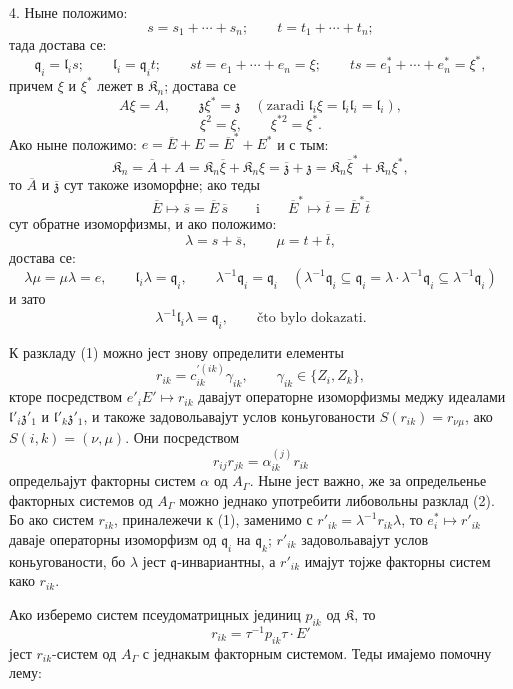\documentclass[11pt]{article}
\begin{document}
4. Ныне положимо:
\[
s=s_1+\cdots+s_n;\qquad t=t_1+\cdots+t_n;
\]
тада достава се:
\[
\mathfrak q_i=\mathfrak l_is;\qquad
\mathfrak l_i=\mathfrak q_it;\qquad
st=e_1+\cdots+e_n=\xi;\qquad
ts=e_1^*+\cdots+e_n^*=\xi^*,
\]
причем \(\xi\) и \(\xi^*\) лежет в \(\mathfrak K_n\); достава се
\[
A\xi=A,\qquad \mathfrak z\xi^*=\mathfrak z\quad
(\text{zaradi }\mathfrak l_i\xi=\mathfrak l_i\mathfrak l_i=\mathfrak l_i),
\]
\[
\xi^2=\xi,\qquad \xi^{*2}=\xi^*.
\]
Ако ныне положимо: \(e=\overline E+E=\overline E^*+E^*\) и с тым:
\[
\mathfrak K_n=\overline A+A
=\mathfrak K_n\overline\xi+\mathfrak K_n\xi
=\overline{\mathfrak z}+\mathfrak z
=\mathfrak K_n\overline\xi^*+\mathfrak K_n\xi^*,
\]
то \(\overline A\) и \(\overline{\mathfrak z}\) сут такоже изоморфне; ако теды
\[
\overline E\mapsto\overline s=\overline E\,\overline s
\qquad\text{i}\qquad
\overline E^*\mapsto\overline t=\overline E^*\overline t
\]
сут обратне изоморфизмы, и ако положимо:
\[
\lambda=s+\overline s,\qquad \mu=t+\overline t,
\]
достава се:
\[
\lambda\mu=\mu\lambda=e,\qquad
\mathfrak l_i\lambda=\mathfrak q_i,\qquad
\lambda^{-1}\mathfrak q_i=\mathfrak q_i
\quad
(\lambda^{-1}\mathfrak q_i\subseteq\mathfrak q_i
=\lambda\cdot\lambda^{-1}\mathfrak q_i\subseteq\lambda^{-1}\mathfrak q_i)
\]
и зато
\[
\lambda^{-1}\mathfrak l_i\lambda=\mathfrak q_i,\qquad \text{čto bylo dokazati.}
\]

К разкладу (1) можно јест знову определити елементы
\[
r_{ik}=c_{ik}^{\prime(ik)}\gamma_{ik},\qquad \gamma_{ik}\in\{Z_i,Z_k\},
\]
кторе посредством \(e'_iE'\mapsto r_{ik}\) давајут операторне изоморфизмы меджу идеалами \(\mathfrak l'_i\mathfrak z'_1\) и \(\mathfrak l'_k\mathfrak z'_1\), и такоже задовольавајут услов коньугованости \(S(r_{ik})=r_{\nu\mu}\), ако \(S(i,k)=(\nu,\mu)\). Они посредством
\[
r_{ij}r_{jk}=\alpha_{ik}^{(j)}r_{ik}
\]
определьајут факторны систем \(\alpha\) од \(A_\Gamma\). Ныне јест важно, же за определьенье факторных системов од \(A_\Gamma\) можно једнако употребити либовольны разклад (2). Бо ако систем \(r_{ik}\), приналежечи к (1), заменимо с \(r'_{ik}=\lambda^{-1}r_{ik}\lambda\), то \(e_i^*\mapsto r'_{ik}\) даваје операторны изоморфизм од \(\mathfrak q_i\) на \(\mathfrak q_k\); \(r'_{ik}\) задовольавајут услов коньугованости, бо \(\lambda\) јест \(\mathfrak q\)-инвариантны, а \(r'_{ik}\) имајут тојже факторны систем како \(r_{ik}\).

Ако изберемо систем псеудоматрицных јединиц \(p_{ik}\) од \(\mathfrak K\), то
\[
r_{ik}=\tau^{-1}p_{ik}\tau\cdot E'
\]
јест \(r_{ik}\)-систем од \(A_\Gamma\) с једнакым факторным системом. Теды имајемо помочну лему:
\end{document}
